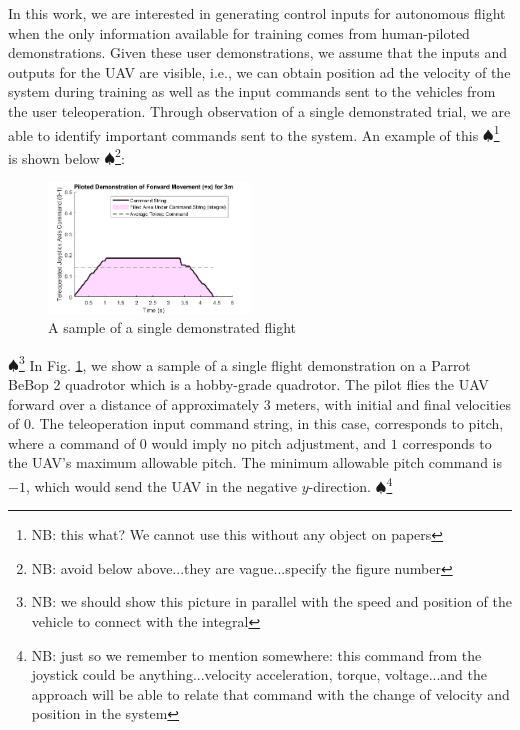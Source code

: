\documentclass[letterpaper, 10 pt, conference]{ieeeconf}  %
\newcommand\NB[1]{$\spadesuit$\footnote{NB: #1}}
\begin{document}
In this work, we are interested in generating control inputs for autonomous flight when the only information available for training comes from human-piloted demonstrations. Given these user demonstrations, we assume that the inputs and outputs for the UAV are visible, i.e., we can obtain position ad the velocity of the system during training as well as the input commands sent to the vehicles from the user teleoperation. 
Through observation of a single demonstrated trial, we are able to identify important commands sent to the system. An example of this \NB{this what? We cannot use this without any object on papers} is shown below \NB{avoid below above...they are vague...specify the figure number}:

\begin{figure}[ht]
    \includegraphics[width=0.48\textwidth]{images/sampleintegral.png}
    \caption{A sample of a single demonstrated flight}
    \label{fig:sampleintegral}
\end{figure}
\NB{we should show this picture in parallel with the speed and position of the vehicle to connect with the integral}
In Fig. \ref{fig:sampleintegral}, we show a sample of a single flight demonstration on a Parrot BeBop 2 quadrotor which is a hobby-grade quadrotor. The pilot flies the UAV forward over a distance of approximately $3$ meters, with initial and final velocities of $0$. The teleoperation input command string, in this case, corresponds to pitch, where a command of $0$ would imply no pitch adjustment, and $1$ corresponds to the UAV's maximum allowable pitch. The minimum allowable pitch command is $-1$, which would send the UAV in the negative $y$-direction.  \NB{just so we remember to mention somewhere: this command from the joystick could be anything...velocity acceleration, torque, voltage...and the approach will be able to relate that command with the change of velocity and position in the system}
\end{document}

